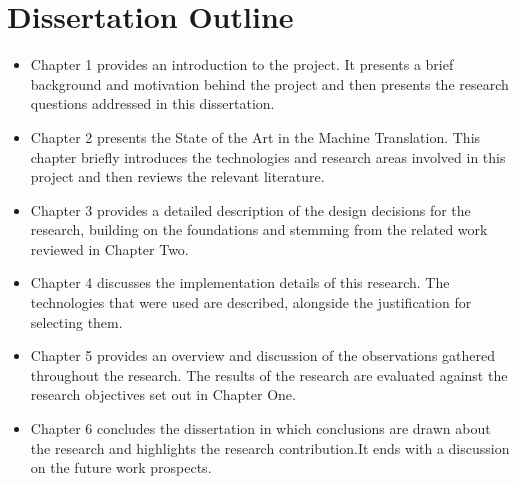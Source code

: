 \section{Dissertation Outline}
\begin{itemize}

\item Chapter 1 provides an introduction to the project. It presents a brief background
and motivation behind the project and then presents the research questions addressed
in this dissertation.

\item Chapter 2 presents the State of the Art in the Machine Translation. This chapter briefly introduces the technologies and research areas involved in this project and then reviews the relevant literature.

\item Chapter 3 provides a detailed description of the design decisions for the research, building on the foundations and stemming from the related work reviewed in Chapter Two.

\item  Chapter 4 discusses the implementation details of this research. The technologies that were used are described, alongside the justification for selecting them.

\item Chapter 5 provides an overview and discussion of the observations gathered throughout
the research. The results of the research are evaluated against the research objectives set out in Chapter One.

\item Chapter 6 concludes the dissertation in which conclusions are drawn about the research and highlights the research contribution.It ends with a discussion on the future work prospects.
\end{itemize}

